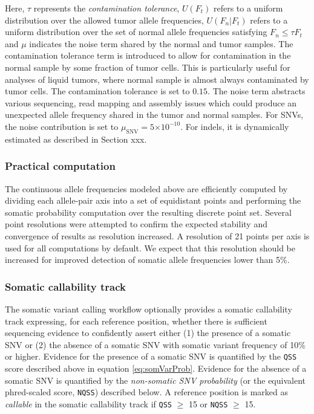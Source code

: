 \documentclass{article}
\newcommand{\e}[1]{\ensuremath{\times 10^{#1}}}
\begin{document}
\noindent Here, $\tau$ represents the {\em contamination tolerance}, $U(F_t)$ refers to a uniform distribution over the allowed tumor allele frequencies, $U(F_n|F_t)$ refers to a uniform distribution over the set of normal allele frequencies satisfying $F_n \leq \tau F_t$ and $\mu$ indicates the noise term shared by the normal and tumor samples. The contamination tolerance term is introduced to allow for contamination in the normal sample by some fraction of tumor cells. This is particularly useful for analyses of liquid tumors, where normal sample is almost always contaminated by tumor cells. The contamination tolerance is set to $0.15$. The noise term abstracts various sequencing, read mapping and assembly issues which could produce an unexpected allele frequency shared in the tumor and normal samples. For SNVs, the noise contribution is set to $\mu_{\text{SNV}} = 5\e{-10}$. For indels, it is dynamically estimated as described in Section xxx.


\subsubsection{Practical computation}

The continuous allele frequencies modeled above are efficiently computed by dividing each allele-pair axis into a set of equidistant points and performing the somatic probability computation over the resulting discrete point set. Several point resolutions were attempted to confirm the expected stability and convergence of results as resolution increased. A resolution of 21 points per axis is used for all computations by default. We expect that this resolution should be increased for improved detection of somatic allele frequencies lower than 5\%.

\subsubsection{Somatic callability track}

The somatic variant calling workflow optionally provides a somatic callability track expressing, for each reference position, whether there is sufficient sequencing evidence to confidently assert either (1) the presence of a somatic SNV or (2) the absence of a somatic SNV with somatic variant frequency of 10\% or higher. Evidence for the presence of a somatic SNV is quantified by the \texttt{QSS} score described above in equation \ref{eq:somVarProb}. Evidence for the absence of a somatic SNV is quantified by the \emph{non-somatic SNV probability} (or the equivalent phred-scaled score, \texttt{NQSS}) described below. A reference position is marked as \emph{callable} in the somatic callability track if \texttt{QSS} $\ge$ 15 or \texttt{NQSS} $\ge$ 15.
\end{document}
